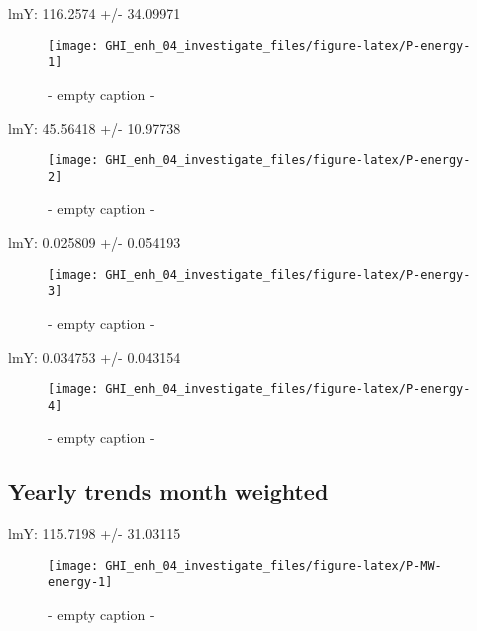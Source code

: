 \documentclass[
  10pt,
  a4paper,oneside]{article}
\begin{document}
lmY: 116.2574 +/- 34.09971

\begin{figure}[H]

{\centering \texttt{[image: GHI\_enh\_04\_investigate\_files/figure-latex/P-energy-1]} 

}

\caption{ - empty caption - }\label{fig:P-energy-1}
\end{figure}

lmY: 45.56418 +/- 10.97738

\begin{figure}[H]

{\centering \texttt{[image: GHI\_enh\_04\_investigate\_files/figure-latex/P-energy-2]} 

}

\caption{ - empty caption - }\label{fig:P-energy-2}
\end{figure}

lmY: 0.025809 +/- 0.054193

\begin{figure}[H]

{\centering \texttt{[image: GHI\_enh\_04\_investigate\_files/figure-latex/P-energy-3]} 

}

\caption{ - empty caption - }\label{fig:P-energy-3}
\end{figure}

lmY: 0.034753 +/- 0.043154

\begin{figure}[H]

{\centering \texttt{[image: GHI\_enh\_04\_investigate\_files/figure-latex/P-energy-4]} 

}

\caption{ - empty caption - }\label{fig:P-energy-4}
\end{figure}

\newpage

\hypertarget{yearly-trends-month-weighted}{%
\subsection{Yearly trends month weighted}\label{yearly-trends-month-weighted}}

lmY: 115.7198 +/- 31.03115

\begin{figure}[H]

{\centering \texttt{[image: GHI\_enh\_04\_investigate\_files/figure-latex/P-MW-energy-1]} 

}

\caption{ - empty caption - }\label{fig:P-MW-energy-1}
\end{figure}
\end{document}

